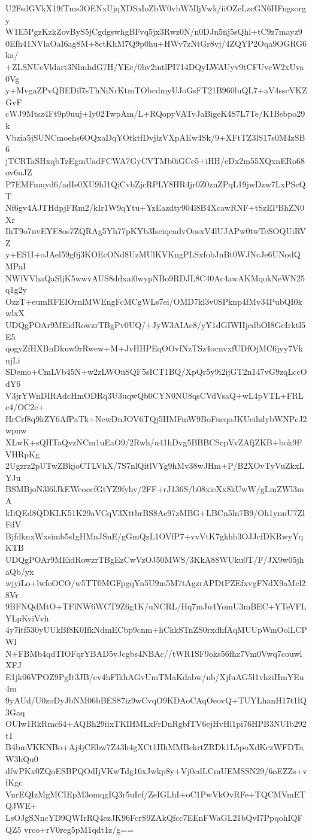 U2FsdGVkX19fTms3OENxUjqXDSaIoZbW0vbW5IljVwk/iiOZeLzcGN6HFngsorgy
W1E5PgzKzkZovByS5jCgdgswhgBFvq5jx3Rwz0N/n0DJn5nj5sQhl+tC9z7mayz9
0Efh41NVlaOaI6ag8M+8ctKhM7Q9p0hu+HWv7zNtGr8vj/4ZQYP2Oqa9OGRG6ka/
+ZLSNUcVldart3NlmhdG7H/YEc/0hv2mtlPI714DQyLWAUyv9tCFUvcW2xUva0Vg
y+MvgaZPvQBEDil7sThNiNrKtmTObcdmyUJoGsFT21B960luQL7+aV4sscVKZGvF
cWJ9Mtsz4Ft9p9uuj+Iy02TwpAm/L+RQopyVATvJaBigeK4S7L7Te/K1Bsbpo29k
Vbzia5jSUNCmoehs6OQxaDqYOtktfDvjlzVXpAEw4Sk/9+XFtTZ3lS17s0M4zSB6
jTCRTaSHxqbTzEgmUadFCWA7GyCVTMb0iGCe5+iHH/eDx2m55XQxnERo68ov6uJZ
P7EMFmuyd6/adIe0XU9hI1QiCvbZjcRPLY8HR4jr0Z0znZPqL19jwDzw7LxPScQT
Nf6gv4AJTHdpjFRm2/kIr1W9qYtu+YzEazdty904l8B4XcawRNF+tSzEPBhZN0Xr
IhT9o7nvEYF8os7ZQRAg5Yh77pKYb3IseiqeadvOosxV4lUJAPw0twTeSOQUiRVZ
y+ES1I+oJAel59g0j3KOEcONd8UzMUlKVKngPLSxfobJnBt0WJNcJe6UNodQMPaI
NWfVVhaQaSljK5wwvAUS8ddxai0wypNBo9RDJL8C40Ac4awAKMqokNeWN25q1g2y
OzzT+eumRFEIOrnlMWEngFcMCgWLs7ei/OMD7kl3v0SPknp4fMv34PubQI0kwlxX
UDQgPOAr9MEidRowzrTBgPv0UQ/+JyW3AIAe8/yY1dGIWIIjcdbOI8GeIrktl5E5
qogyZfHXBnDkuw9rRwew+M+JvHHPEqOOvfNzTSz4ocnvxfUDfOjMC6jyy7VknjLi
SDemo+CmLVb45N+w2zLWOuSQF5sICT1BQ/XpQr5y9i2ijGT2n147vG9zqLccOdY6
V3jrYWnDIRAdcHmODRq3U3uqwQb0CYN0NU8qsCVdVsaQ+wL4pVTL+FRLc4/OC2c+
HrCrf8q9kZY6AfPaTk+NewDnJOV6TQj5HMFmW9BoFucqoJKUcihdybWNPcJ2wpnw
XLwK+sQHTaQvzNCm1uEaO9/2Rwh/u41hDvg5BBBCScpVvZAfjZKB+bok9FVHRpKg
2Ugzrz2pUTwZBkjoCTLVhX/7S7nlQitlVYg9hMv38wJHm+P/B2XOvTyVuZkxLYJu
BSMBjoN3l6lJkEWcoecfGtYZ9fyhv/2FF+rJ136S/b08xieXx8kUwW/gLmZWl3mA
kIiQEd8QDKLK51K29aVCqV3XttbrBS8Ae97zMBG+LBCn5ln7B9/Oh1ynnU7ZlFdV
BjfdknxWxsimb5sIgHMnJSnE/gGmQzL1OVfP7+vvVtK7gkhb3OJJcfDKRwyYqKTB
UDQgPOAr9MEidRowzrTBgEzCwVzOJ50MWS/3KkA88WUku0T/F/JX9w05jhaQb/yx
wjyiLo+lwfoOCO/w5TT0MGFpgqYn5U9m5M7tAgzrAPDtPZEfxvgFNdX9aMcl28Vr
9BFNQdMtO+TFlNW6WCT9Z6g1K/uNCRL/Hq7mJu4YomU3mBEC+YTeVFLYLpKviVvh
4y7itf530yUUkBf8K0IfkNdmECbp9cnm+hCkkSTnZS0rxdhfAqMUUpWmOolLCPWl
N+FBMb4qdTIOFqrYBAD5vJcgbs4NBAc//tWR1SF9oks56fhz7Vm0Vwq7couwlXFJ
E1jk06VPOZ9PgIt3JB/cv4hFIkhAGvUmTMaKdabw/nb/XjfuAG5l1vhziHmYEu4m
9yAUd/U0zoDyJbNM06bBES87iz9wCvqO9KDAoCAqOeovQ+TUYLhanH17t1lQ3Gaq
OUlw1RkRmc64+AQBh29iixTKIHMLxFrDnRgbfTV6ejHvHl1pi76HPB3NUIb292t1
B4bmVKKNBo+Aj4jCEbw7Z43h4gXCt1HhMMBckrtZRDk1L5poXdKczWFDTaW3hQu0
dfwPKx0ZQoESBPQOdIjVKwTdg16xJwkp8y+Vj0cdLCmUEMSSN29/6oEZZs+vfKgc
VnrEQIzMgMCIEpM3omqgIQ3r5uIcf/ZeIGLhI+oC1PwVkOvRFe+TQCMVmETQJWE+
LsOJgSNncYD9QWIrRQ4ezJK96FcrS9ZAkQfcc7EEnFWaGL21bQvI7PpqohIQFQZ5
vrco+rV0reg5pM1qdt1z/g==
